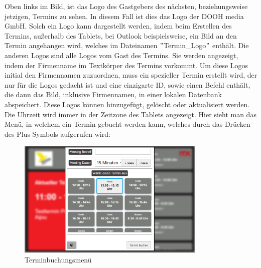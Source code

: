 \justifying
\newline
Oben links im Bild, ist das Logo des Gastgebers des nächsten, beziehungsweise jetzigen, Termins zu sehen.
In diesem Fall ist dies das Logo der DOOH media GmbH\@.
Solch ein Logo kann dargestellt werden, indem beim Erstellen des Termins, außerhalb des Tablets, bei Outlook beispielsweise, ein Bild an den Termin angehangen wird, welches im Dateinamen \("\)Termin\_Logo\("\) enthält.
\newline
Die anderen Logos sind alle Logos vom Gast des Termins.
Sie werden angezeigt, indem der Firmenname im Textkörper des Termins vorkommt.
Um diese Logos initial den Firmennamen zuzuordnen, muss ein spezieller Termin erstellt wird, der nur für die Logos gedacht ist und eine einzigarte ID, sowie einen Befehl enthält, die dann das Bild, inklusive Firmennamen, in einer lokalen Datenbank abspeichert.
Diese Logos können hinzugefügt, gelöscht oder aktualisiert werden.
\newline
Die Uhrzeit wird immer in der Zeitzone des Tablets angezeigt.
\newline
\newline
Hier sieht man das Menü, in welchem ein Termin gebucht werden kann, welches durch das Drücken des Plus-Symbols aufgerufen wird:
\begin{figure}[h]
\par\vspace{1cm}
    \centering
    \includegraphics[width=0.8\textwidth]{Bilder/Ergebnis_TerminErstellen_Menue}
    \caption{Terminbuchungsmenü}
    \label{fig:Menue}
\par\vspace{1cm}
\end{figure}
\justifying

